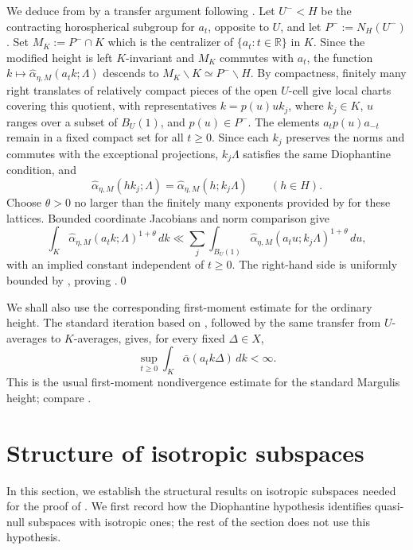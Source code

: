 \documentclass[reqno,11pt]{amsart}
\numberwithin{equation}{section}
\theoremstyle{definition}
\theoremstyle{remark}
\begin{document}
\medskip
We deduce  from
 by a transfer argument following
\cite[Section~7.2]{Kim}. Let $U^-<H$ be the contracting horospherical
subgroup for $a_t$, opposite to $U$, and let $P^-:=N_H(U^-)$.
Set
$M_K:=P^-\cap K$ which is the centralizer of $\{a_t:t\in\mathbb R\}$ in $K$.
Since the modified height is left $K$-invariant and $M_K$
commutes with $a_t$, the function
$k\mapsto\widehat\alpha_{\eta,M}(a_tk;\Lambda)$ descends to
$M_K\backslash K\simeq P^-\backslash H$.
By compactness, finitely many right translates of relatively compact
pieces of the open $U$-cell give local charts covering this
quotient, with representatives
$k=p(u)uk_j$, where $k_j\in K$, $u$ ranges over a subset of
$B_U(1)$, and $p(u)\in P^-$.
The elements $a_tp(u)a_{-t}$ remain in a fixed compact set
for all $t\ge0$.
Since each $k_j$ preserves the norms and commutes with the
exceptional projections, $k_j\Lambda$ satisfies the same
Diophantine condition, and
$$
\widehat\alpha_{\eta,M}(hk_j;\Lambda)
=
\widehat\alpha_{\eta,M}(h;k_j\Lambda)
\qquad (h\in H).
$$
Choose $\theta>0$ no larger than the finitely many exponents
provided by  for these lattices.
Bounded coordinate Jacobians and norm comparison give
$$
\int_K \widehat\alpha_{\eta,M}(a_tk;\Lambda)^{1+\theta}\,dk
\ll
\sum_j \int_{B_U(1)}
\widehat\alpha_{\eta,M}(a_tu;k_j\Lambda)^{1+\theta}\,du,
$$
with an implied constant independent of $t\ge0$.
The right-hand side is uniformly bounded by
, proving
.\qed


We shall also use the corresponding first-moment estimate for the ordinary
height. The standard iteration based on
, followed by the same transfer from
$U$-averages to $K$-averages, gives, for every fixed $\Delta\in X$,
\begin{equation}\label{eq:standardalphauniformboundednesscompact}
\sup_{t\ge0}
\int_K\bar\alpha(a_tk\Delta)\,dk<\infty.
\end{equation}
This is the usual first-moment nondivergence estimate for the standard
Margulis height; compare \cite[Section~7]{eskin-margulis-mozes:1998}.

\section{Structure of isotropic subspaces}\label{s:quasinull}
In this section, we establish the structural results on isotropic subspaces
needed for the proof of . We first record
how the Diophantine hypothesis identifies quasi-null subspaces with
isotropic ones; the rest of the section does not use this hypothesis.
\end{document}
